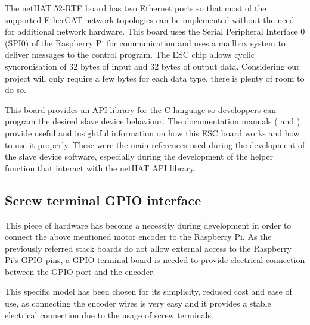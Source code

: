 The netHAT 52-RTE board has two Ethernet ports so that most of the supported EtherCAT network topologies can be implemented without the need for additional network hardware.
This board uses the Serial Peripheral Interface 0 (SPI0) of the Raspberry Pi for communication and uses a mailbox system to deliver messages to the control program.
The ESC chip allows cyclic syncronisation of 32 bytes of input and 32 bytes of output data.
Considering our project will only require a few bytes for each data type, there is plenty of room to do so.

This board provides an API library for the C language so developpers can program the desired slave device behaviour.
The documentation manuals (\cite{nethat:cifx_api_docs} and \cite{nethat:ethercat_api_docs}) provide useful and insightful information on how this ESC board works and how to use it properly.
These were the main references used during the development of the slave device software, especially during the development of the helper function that interact with the netHAT API library.

\subsection{Screw terminal GPIO interface}
This piece of hardware has become a necessity during development in order to connect the above mentioned motor encoder to the Raspberry Pi.
As the previously referred stack boards do not allow external access to the Raspberry Pi's GPIO pins, a GPIO terminal board is needed to provide electrical connection between the GPIO port and the encoder.

This specific model has been chosen for its simplicity, reduced cost and ease of use, as connecting the encoder wires is very easy and it provides a stable electrical connection due to the usage of screw terminals.
